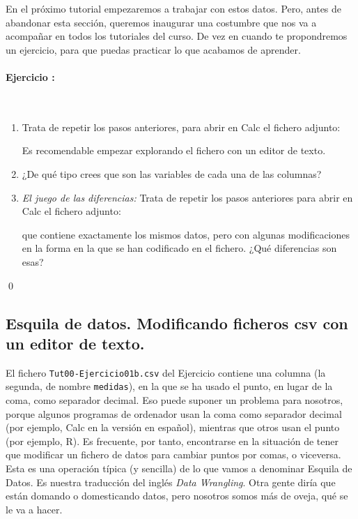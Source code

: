 \documentclass[10pt,a4paper]{article}
\newcounter {cont01}
\begin{document}
En el próximo tutorial empezaremos a trabajar con estos datos. Pero, antes de abandonar esta
sección, queremos inaugurar una costumbre que nos va a acompañar en todos los tutoriales del curso.
De vez en cuando te propondremos un ejercicio, para que puedas practicar lo que acabamos de
aprender.

\paragraph{Ejercicio \theEjercicioI:}\quad\\
\begin{enumerate}
  \item Trata de repetir los pasos anteriores, para abrir en Calc el fichero adjunto:
        \begin{center}
        \end{center}
        Es recomendable empezar explorando el fichero con un editor de texto.
  \item ¿De qué tipo crees que son las variables de cada una de las columnas?
  \item {\em El juego de las diferencias:} Trata de repetir los pasos anteriores para abrir en
      Calc el fichero adjunto:
        \begin{center}
        \end{center}
        que contiene exactamente los mismos datos, pero con algunas modificaciones en la forma en
        la que se han codificado en el fichero. ¿Qué diferencias son esas?
\end{enumerate}
\qed


\subsection{Esquila de datos. Modificando ficheros csv con un editor de texto.}

El fichero {\tt Tut00-Ejercicio01b.csv} del Ejercicio {\theEjercicioI} contiene una columna (la
segunda, de nombre {\tt medidas}), en la que se ha usado el punto, en lugar de la coma, como
separador decimal. Eso puede suponer un problema para nosotros, porque algunos programas de
ordenador usan la coma como separador decimal (por ejemplo, Calc en la versión en español),
mientras que otros usan el punto (por ejemplo, R). Es frecuente, por tanto, encontrarse en la
situación de tener que modificar un fichero de datos para cambiar puntos por comas, o viceversa.
Esta es una operación típica (y sencilla) de lo que vamos a denominar {\sf Esquila de Datos}. Es
nuestra traducción del inglés {\em Data Wrangling}. Otra gente diría que están domando o
domesticando datos, pero nosotros somos más de oveja, qué se le va a hacer.
\end{document}
